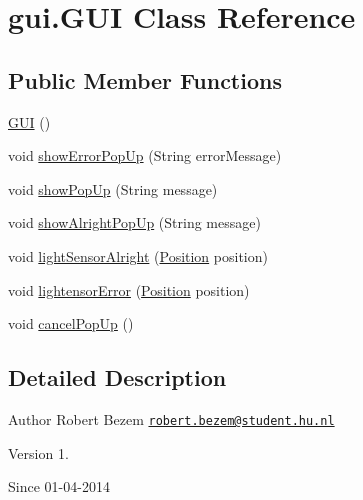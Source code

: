 \hypertarget{classgui_1_1_g_u_i}{\section{gui.\-G\-U\-I Class Reference}
\label{classgui_1_1_g_u_i}
}
\subsection*{Public Member Functions}
\begin{DoxyCompactItemize}
\item 
\hyperlink{classgui_1_1_g_u_i_a2615d0a83cbc5e536a84b34f4f5fed77}{G\-U\-I} ()
\item 
void \hyperlink{classgui_1_1_g_u_i_a7f3457e6364a1918bdc9ee076ce7987c}{show\-Error\-Pop\-Up} (String error\-Message)
\item 
void \hyperlink{classgui_1_1_g_u_i_a0bd183726fb08c503d415fbe01b977a3}{show\-Pop\-Up} (String message)
\item 
void \hyperlink{classgui_1_1_g_u_i_a1e2c70edff7557e9d1828bbce70cc052}{show\-Alright\-Pop\-Up} (String message)
\item 
void \hyperlink{classgui_1_1_g_u_i_a680939303c766a1d1b1c86dcfd074255}{light\-Sensor\-Alright} (\hyperlink{enumsensors_1_1_position}{Position} position)
\item 
void \hyperlink{classgui_1_1_g_u_i_a8912704162cb5ae17664a4f5f13297a6}{lightensor\-Error} (\hyperlink{enumsensors_1_1_position}{Position} position)
\item 
void \hyperlink{classgui_1_1_g_u_i_a40263a862e3eceee24f000abbfb10fa5}{cancel\-Pop\-Up} ()
\end{DoxyCompactItemize}


\subsection{Detailed Description}
\begin{DoxyAuthor}{Author}
Robert Bezem \href{mailto:robert.bezem@student.hu.nl}{\tt robert.\-bezem@student.\-hu.\-nl} 
\end{DoxyAuthor}
\begin{DoxyVersion}{Version}
1. 
\end{DoxyVersion}
\begin{DoxySince}{Since}
01-\/04-\/2014 
\end{DoxySince}


